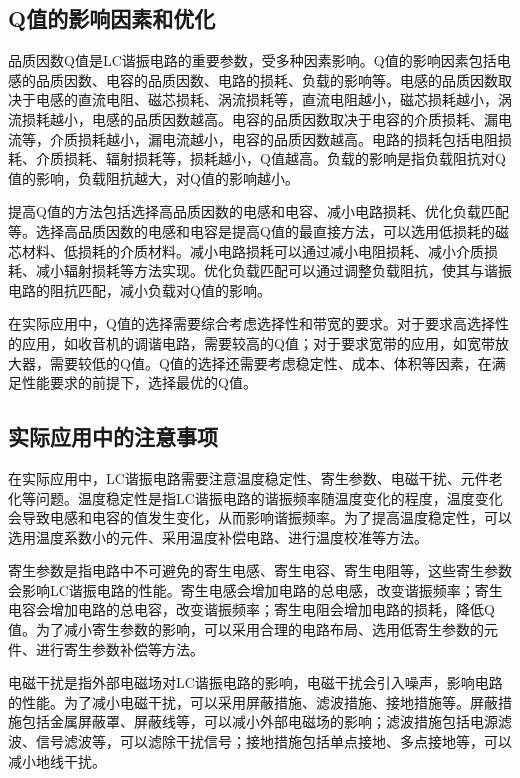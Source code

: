 \documentclass[12pt,UTF8]{ctexbook}
\begin{document}
\subsection{Q值的影响因素和优化}

品质因数Q值是LC谐振电路的重要参数，受多种因素影响。Q值的影响因素包括电感的品质因数、电容的品质因数、电路的损耗、负载的影响等。电感的品质因数取决于电感的直流电阻、磁芯损耗、涡流损耗等，直流电阻越小，磁芯损耗越小，涡流损耗越小，电感的品质因数越高。电容的品质因数取决于电容的介质损耗、漏电流等，介质损耗越小，漏电流越小，电容的品质因数越高。电路的损耗包括电阻损耗、介质损耗、辐射损耗等，损耗越小，Q值越高。负载的影响是指负载阻抗对Q值的影响，负载阻抗越大，对Q值的影响越小。

提高Q值的方法包括选择高品质因数的电感和电容、减小电路损耗、优化负载匹配等。选择高品质因数的电感和电容是提高Q值的最直接方法，可以选用低损耗的磁芯材料、低损耗的介质材料。减小电路损耗可以通过减小电阻损耗、减小介质损耗、减小辐射损耗等方法实现。优化负载匹配可以通过调整负载阻抗，使其与谐振电路的阻抗匹配，减小负载对Q值的影响。

在实际应用中，Q值的选择需要综合考虑选择性和带宽的要求。对于要求高选择性的应用，如收音机的调谐电路，需要较高的Q值；对于要求宽带的应用，如宽带放大器，需要较低的Q值。Q值的选择还需要考虑稳定性、成本、体积等因素，在满足性能要求的前提下，选择最优的Q值。

\subsection{实际应用中的注意事项}

在实际应用中，LC谐振电路需要注意温度稳定性、寄生参数、电磁干扰、元件老化等问题。温度稳定性是指LC谐振电路的谐振频率随温度变化的程度，温度变化会导致电感和电容的值发生变化，从而影响谐振频率。为了提高温度稳定性，可以选用温度系数小的元件、采用温度补偿电路、进行温度校准等方法。

寄生参数是指电路中不可避免的寄生电感、寄生电容、寄生电阻等，这些寄生参数会影响LC谐振电路的性能。寄生电感会增加电路的总电感，改变谐振频率；寄生电容会增加电路的总电容，改变谐振频率；寄生电阻会增加电路的损耗，降低Q值。为了减小寄生参数的影响，可以采用合理的电路布局、选用低寄生参数的元件、进行寄生参数补偿等方法。

电磁干扰是指外部电磁场对LC谐振电路的影响，电磁干扰会引入噪声，影响电路的性能。为了减小电磁干扰，可以采用屏蔽措施、滤波措施、接地措施等。屏蔽措施包括金属屏蔽罩、屏蔽线等，可以减小外部电磁场的影响；滤波措施包括电源滤波、信号滤波等，可以滤除干扰信号；接地措施包括单点接地、多点接地等，可以减小地线干扰。
\end{document}
